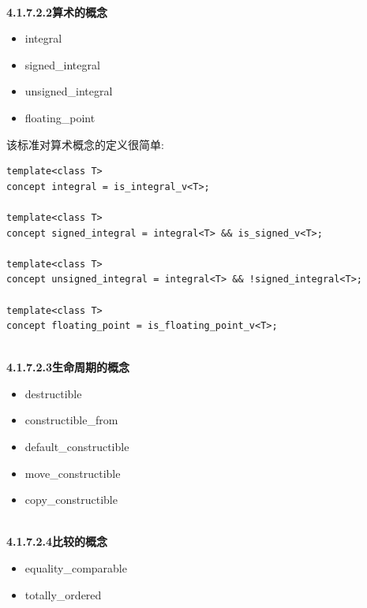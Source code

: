 \hspace*{\fill} \\ %
\noindent
\textbf{4.1.7.2.2\hspace{0.2cm}算术的概念}

\begin{itemize}
\item
integral

\item
signed\_integral

\item
unsigned\_integral

\item
floating\_point
\end{itemize}

该标准对算术概念的定义很简单:

\begin{lstlisting}[style=styleCXX]
template<class T>
concept integral = is_integral_v<T>;

template<class T>
concept signed_integral = integral<T> && is_signed_v<T>;

template<class T>
concept unsigned_integral = integral<T> && !signed_integral<T>;

template<class T>
concept floating_point = is_floating_point_v<T>;
\end{lstlisting}

\hspace*{\fill} \\ %
\noindent
\textbf{4.1.7.2.3\hspace{0.2cm}生命周期的概念}

\begin{itemize}
\item
destructible

\item
constructible\_from

\item
default\_constructible

\item
move\_constructible

\item
copy\_constructible
\end{itemize}

\hspace*{\fill} \\ %
\noindent
\textbf{4.1.7.2.4\hspace{0.2cm}比较的概念}

\begin{itemize}
\item
equality\_comparable

\item
totally\_ordered
\end{itemize}

